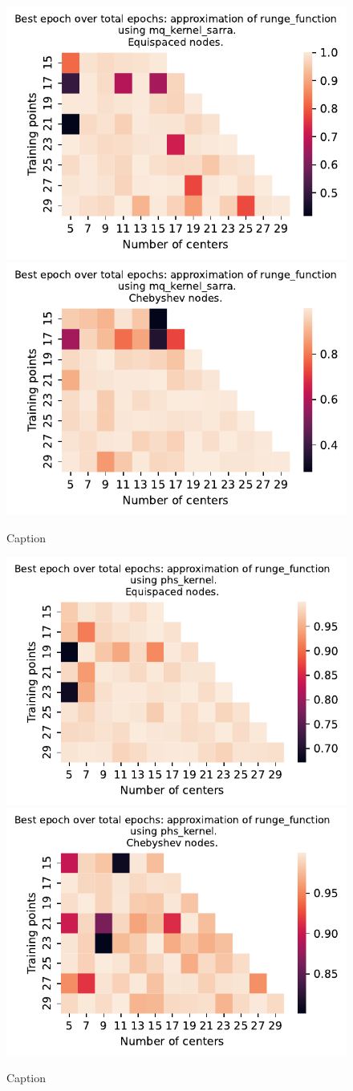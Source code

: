 \documentclass[12pt]{report} %
\begin{document}
\begin{figure}[ht]
    \centering
    
    \includegraphics[width=.49\textwidth]{imagenes/experiments/1d/variational_epochs/runge_function-Kmq_kernel_sarra-Equi-epochs.pdf}
    \includegraphics[width=.49\textwidth]{imagenes/experiments/1d/variational_epochs/runge_function-Kmq_kernel_sarra-Cheb-epochs.pdf}
    \caption{Caption}
    \label{fig:epochs-runge-sarra}
\end{figure}


\begin{figure}[ht]
    \centering
    
    \includegraphics[width=.49\textwidth]{imagenes/experiments/1d/variational_epochs/runge_function-Kphs_kernel-Equi-epochs.pdf}
    \includegraphics[width=.49\textwidth]{imagenes/experiments/1d/variational_epochs/runge_function-Kphs_kernel-Cheb-epochs.pdf}
    \caption{Caption}
    \label{fig:epochs-runge-phs}
\end{figure}
\end{document}

